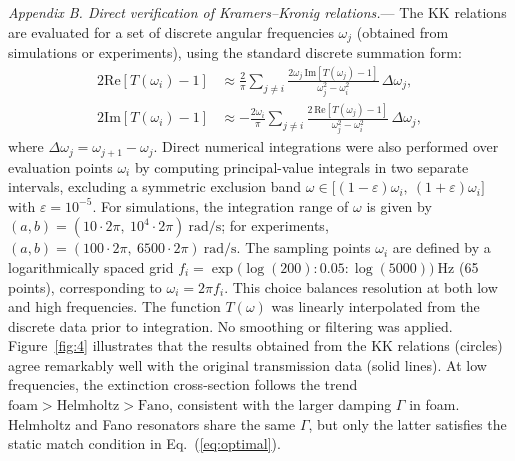 \documentclass[final,5p,times,twocolumn]{elsarticle}
\begin{document}
\textit{Appendix B. Direct verification of Kramers--Kronig relations.}— The KK relations are evaluated for a set of discrete angular frequencies $\omega_j$ (obtained from simulations or experiments), using the standard discrete summation form:
\begin{subequations}
	\begin{align}
		2\mathrm{Re}[T(\omega_i) - 1] &\approx \frac{2}{\pi} \sum_{j \ne i} \frac{ 2\omega_j\,\mathrm{Im}[T(\omega_j) - 1]}{\omega_j^2 - \omega_i^2}\, \Delta\omega_j, \\
		2\mathrm{Im}[T(\omega_i) - 1] &\approx -\frac{2\omega_i}{\pi} \sum_{j \ne i} \frac{2\,\mathrm{Re}[T(\omega_j) - 1]}{\omega_j^2 - \omega_i^2} \, \Delta\omega_j,
	\end{align}
\end{subequations}
where $\Delta\omega_j = \omega_{j+1} - \omega_j$. {\color{black}Direct numerical integrations were also performed over evaluation points \(\omega_i\) by computing principal-value integrals in two separate intervals, excluding a symmetric exclusion band \(\omega \in \big[(1 - \varepsilon)\omega_i,\ (1 + \varepsilon)\omega_i\big]\) with \(\varepsilon = 10^{-5}\). For simulations, the integration range of \(\omega\) is given by \((a, b) = \left(10 \cdot 2\pi,\ 10^4 \cdot 2\pi\right)\ \mathrm{rad/s}\); for experiments, \((a, b) = \left(100 \cdot 2\pi,\ 6500 \cdot 2\pi\right)\ \mathrm{rad/s}\). The sampling points \(\omega_i\) are defined by a logarithmically spaced grid \(f_i = \exp\big(\log(200): 0.05: \log(5000)\big)\ \mathrm{Hz}\) (65 points), corresponding to \(\omega_i = 2\pi f_i\). This choice balances resolution at both low and high frequencies. The function \(T(\omega)\) was linearly interpolated from the discrete data prior to integration. No smoothing or filtering was applied. Figure~\ref{fig:4} illustrates that the results obtained from the KK relations (circles) agree remarkably well with the original transmission data (solid lines). At low frequencies, the extinction cross-section follows the trend \(\mathrm{foam} > \mathrm{Helmholtz} > \mathrm{Fano}\), consistent with the larger damping \(\Gamma\) in foam. Helmholtz and Fano resonators share the same \(\Gamma\), but only the latter satisfies the static match condition in Eq.~(\ref{eq:optimal}).}
\end{document}
